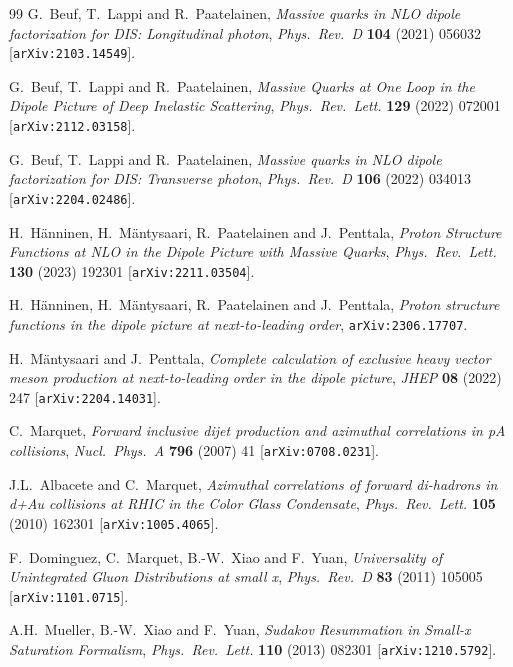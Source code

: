 \documentclass[11pt,a4paper]{article}
\numberwithin{equation}{section}
\begin{document}
\begin{thebibliography}{99}
G.~Beuf, T.~Lappi and R.~Paatelainen, \emph{Massive quarks in NLO dipole factorization for
DIS: Longitudinal photon}, \emph{Phys.\ Rev.\ D} {\bf 104} (2021) 056032
[\texttt{arXiv:2103.14549}].

G.~Beuf, T.~Lappi and R.~Paatelainen, \emph{Massive Quarks at One Loop in the Dipole Picture
of Deep Inelastic Scattering}, \emph{Phys.\ Rev.\ Lett.} {\bf 129} (2022) 072001
[\texttt{arXiv:2112.03158}].

G.~Beuf, T.~Lappi and R.~Paatelainen, \emph{Massive quarks in NLO dipole factorization for
DIS: Transverse photon}, \emph{Phys.\ Rev.\ D} {\bf 106} (2022) 034013
[\texttt{arXiv:2204.02486}].

H.~H\"anninen, H.~M\"antysaari, R.~Paatelainen and J.~Penttala, \emph{Proton Structure
Functions at NLO in the Dipole Picture with Massive Quarks}, \emph{Phys.\ Rev.\ Lett.}
{\bf 130} (2023) 192301 [\texttt{arXiv:2211.03504}].

H.~H\"anninen, H.~M\"antysaari, R.~Paatelainen and J.~Penttala, \emph{Proton structure
functions in the dipole picture at next-to-leading order}, \texttt{arXiv:2306.17707}.

H.~M\"antysaari and J.~Penttala, \emph{Complete calculation of exclusive heavy vector meson
production at next-to-leading order in the dipole picture}, \emph{JHEP} {\bf 08} (2022) 247
[\texttt{arXiv:2204.14031}].

C.~Marquet, \emph{Forward inclusive dijet production and azimuthal correlations in pA
collisions}, \emph{Nucl.\ Phys.\ A} {\bf 796} (2007) 41 [\texttt{arXiv:0708.0231}].

J.L.~Albacete and C.~Marquet, \emph{Azimuthal correlations of forward di-hadrons in d+Au
collisions at RHIC in the Color Glass Condensate}, \emph{Phys.\ Rev.\ Lett.} {\bf 105}
(2010) 162301 [\texttt{arXiv:1005.4065}].

F.~Dominguez, C.~Marquet, B.-W.~Xiao and F.~Yuan, \emph{Universality of Unintegrated Gluon
Distributions at small x}, \emph{Phys.\ Rev.\ D} {\bf 83} (2011) 105005
[\texttt{arXiv:1101.0715}].

A.H.~Mueller, B.-W.~Xiao and F.~Yuan, \emph{Sudakov Resummation in Small-x Saturation
Formalism}, \emph{Phys.\ Rev.\ Lett.} {\bf 110} (2013) 082301 [\texttt{arXiv:1210.5792}].


\end{thebibliography}
\end{document}

